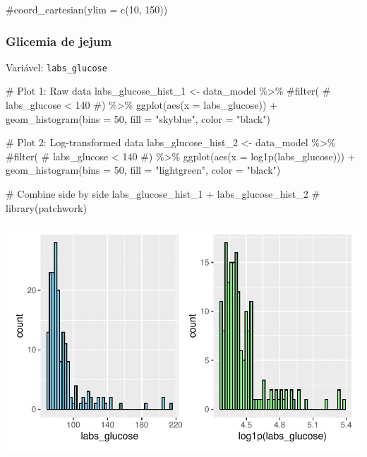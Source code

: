 \documentclass[
  12pt,
]{article}
\newenvironment{Shaded}{\begin{snugshade}}{\end{snugshade}}
\newcommand{\AttributeTok}[1]{\textcolor[rgb]{0.40,0.45,0.13}{#1}}
\newcommand{\CommentTok}[1]{\textcolor[rgb]{0.37,0.37,0.37}{#1}}
\newcommand{\DecValTok}[1]{\textcolor[rgb]{0.68,0.00,0.00}{#1}}
\newcommand{\FunctionTok}[1]{\textcolor[rgb]{0.28,0.35,0.67}{#1}}
\newcommand{\NormalTok}[1]{\textcolor[rgb]{0.00,0.23,0.31}{#1}}
\newcommand{\OtherTok}[1]{\textcolor[rgb]{0.00,0.23,0.31}{#1}}
\newcommand{\SpecialCharTok}[1]{\textcolor[rgb]{0.37,0.37,0.37}{#1}}
\newcommand{\StringTok}[1]{\textcolor[rgb]{0.13,0.47,0.30}{#1}}
\begin{document}
\begin{Shaded}
\begin{Highlighting}[]
    \CommentTok{\#coord\_cartesian(ylim = c(10, 150))}
\end{Highlighting}
\end{Shaded}

\subsubsection{Glicemia de jejum}\label{glicemia-de-jejum}

Variável: \texttt{labs\_glucose}

\begin{Shaded}
\begin{Highlighting}[]
\CommentTok{\# Plot 1: Raw data}
\NormalTok{labs\_glucose\_hist\_1 }\OtherTok{\textless{}{-}}\NormalTok{ data\_model }\SpecialCharTok{\%\textgreater{}\%} 
    \CommentTok{\#filter(}
    \CommentTok{\#    labs\_glucose \textless{} 140}
    \CommentTok{\#) \%\textgreater{}\% }
    \FunctionTok{ggplot}\NormalTok{(}\FunctionTok{aes}\NormalTok{(}\AttributeTok{x =}\NormalTok{ labs\_glucose)) }\SpecialCharTok{+} 
    \FunctionTok{geom\_histogram}\NormalTok{(}\AttributeTok{bins =} \DecValTok{50}\NormalTok{, }\AttributeTok{fill =} \StringTok{"skyblue"}\NormalTok{, }\AttributeTok{color =} \StringTok{"black"}\NormalTok{)}

\CommentTok{\# Plot 2: Log{-}transformed data}
\NormalTok{labs\_glucose\_hist\_2 }\OtherTok{\textless{}{-}}\NormalTok{ data\_model }\SpecialCharTok{\%\textgreater{}\%} 
    \CommentTok{\#filter(}
    \CommentTok{\#    labs\_glucose \textless{} 140}
    \CommentTok{\#) \%\textgreater{}\%}
    \FunctionTok{ggplot}\NormalTok{(}\FunctionTok{aes}\NormalTok{(}\AttributeTok{x =} \FunctionTok{log1p}\NormalTok{(labs\_glucose))) }\SpecialCharTok{+} 
    \FunctionTok{geom\_histogram}\NormalTok{(}\AttributeTok{bins =} \DecValTok{50}\NormalTok{, }\AttributeTok{fill =} \StringTok{"lightgreen"}\NormalTok{, }\AttributeTok{color =} \StringTok{"black"}\NormalTok{)}

\CommentTok{\# Combine side by side}
\NormalTok{labs\_glucose\_hist\_1 }\SpecialCharTok{+}\NormalTok{ labs\_glucose\_hist\_2 }\CommentTok{\# library(patchwork)}
\end{Highlighting}
\end{Shaded}

\includegraphics{Outcomes_files/figure-pdf/labs_glucose_1-1.pdf}
\end{document}
